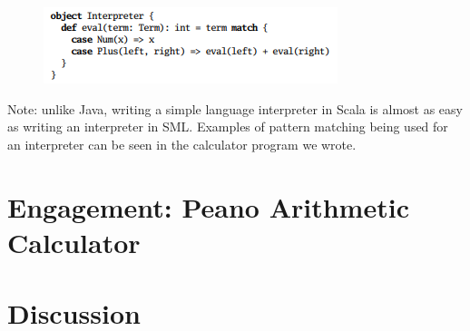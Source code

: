 \documentclass[jou,apacite]{IEEEtran}
\begin{document}
  \begin{figure}[h]
    \centering
    \includegraphics[width=\columnwidth]{pattern_match}
    \caption{}
    \label{fig:example}
  \end{figure}
Note: unlike Java, writing a simple language interpreter in Scala is almost as easy as writing an interpreter in SML. Examples of pattern matching being used for an interpreter can be seen in the calculator program we wrote.








\section{Engagement: Peano Arithmetic Calculator}
\label{sec:engag-peano-arithm}

\section{Discussion}
\label{sec:discussion}
\end{document}
